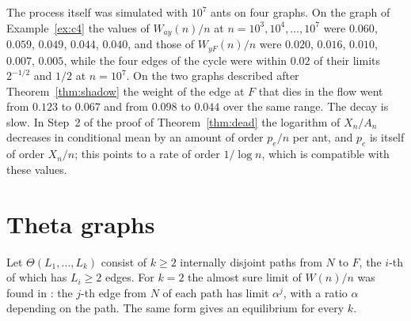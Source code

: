 \documentclass[11pt]{amsart}
\theoremstyle{remark}
\begin{document}
The process itself was simulated with $10^7$ ants on four graphs. On the graph of Example~\ref{ex:c4} the values of
$W_{ay}(n)/n$ at $n=10^3,10^4,\dots,10^7$ were $0.060$, $0.059$, $0.049$, $0.044$, $0.040$, and those of
$W_{yF}(n)/n$ were $0.020$, $0.016$, $0.010$, $0.007$, $0.005$, while the four edges of the cycle were within $0.02$
of their limits $2^{-1/2}$ and $1/2$ at $n=10^7$. On the two graphs described after Theorem~\ref{thm:shadow} the
weight of the edge at $F$ that dies in the flow went from $0.123$ to $0.067$ and from $0.098$ to $0.044$ over the same
range. The decay is slow. In Step~2 of the proof of Theorem~\ref{thm:dead} the logarithm of $X_n/A_n$ decreases in
conditional mean by an amount of order $p_e/n$ per ant, and $p_e$ is itself of order $X_n/n$; this points to a rate of
order $1/\log n$, which is compatible with these values.
\section{Theta graphs}\label{sec:theta}

Let $\Theta(L_1,\dots,L_k)$ consist of $k\ge2$ internally disjoint paths from $N$ to $F$, the $i$-th of which has
$L_i\ge2$ edges. For $k=2$ the almost sure limit of $W(n)/n$ was found in \cite[Theorem 1.5]{KMS}: the $j$-th edge
from $N$ of each path has limit $\alpha^j$, with a ratio $\alpha$ depending on the path. The same form gives an
equilibrium for every $k$.
\end{document}
